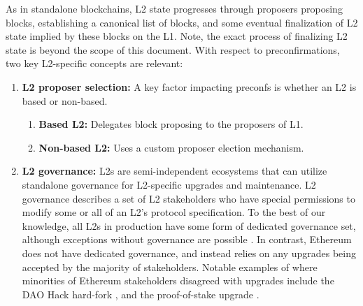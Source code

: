 \documentclass[a4paper]{article}
\theoremstyle{boldstyle}
\begin{document}
As in standalone blockchains, L2 state progresses through proposers proposing blocks, establishing a canonical list of blocks, and some eventual finalization of L2 state implied by these blocks on the L1. Note, the exact process of finalizing L2 state is beyond the scope of this document. With respect to preconfirmations, two key L2-specific concepts are relevant:
\begin{enumerate}
    \item \textbf{L2 proposer selection:} A key factor impacting preconfs is whether an L2 is based or non-based. \begin{enumerate}
        \item \textbf{Based L2:} Delegates block proposing to the proposers of L1.
        \item \textbf{Non-based L2:} Uses a custom proposer election mechanism.
    \end{enumerate}
    \item \textbf{L2 governance:} L2s are semi-independent ecosystems that can utilize standalone governance for L2-specific upgrades and maintenance. L2 governance describes a set of L2 stakeholders who have special permissions to modify some or all of an L2's protocol specification. To the best of our knowledge, all L2s in production have some form of dedicated governance set, although exceptions without governance are possible \cite{W:NativeRollups-SuperpowersfromL1execution}. In contrast, Ethereum does not have dedicated governance, and instead relies on any upgrades being accepted by the majority of stakeholders. Notable examples of where minorities of Ethereum stakeholders disagreed with upgrades include the DAO Hack hard-fork \cite{wiki_the_DAO}, and the proof-of-stake upgrade \cite{EIP-3675}.
\end{enumerate} 
\end{document}
